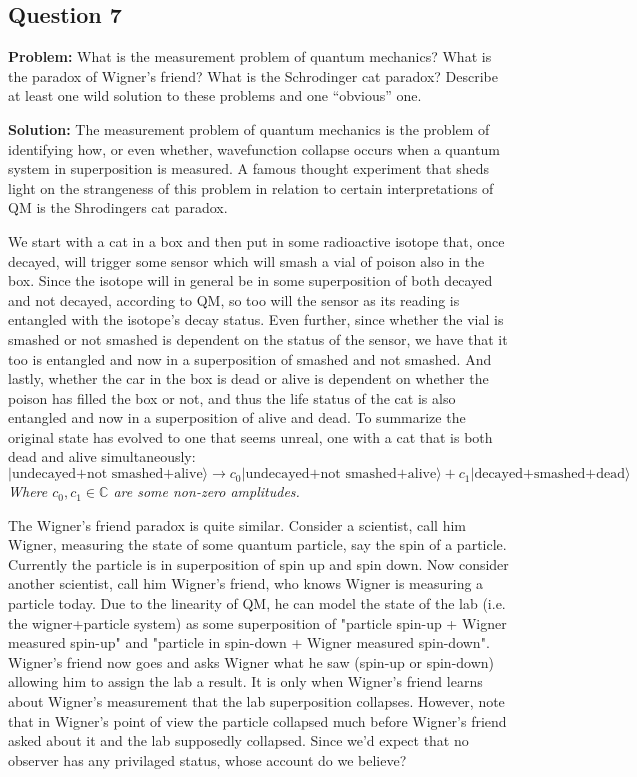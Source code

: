 \documentclass{article}
\begin{document}
\subsection*{Question 7}
\noindent\textbf{Problem:} What is the measurement problem of quantum mechanics? What is the paradox of Wigner's friend? What is the Schrodinger cat paradox? Describe at least one wild solution to these problems and one ``obvious'' one.
\bigskip

\noindent\textbf{Solution:} The measurement problem of quantum mechanics is the problem of identifying how, or even whether, wavefunction collapse occurs when a quantum system in superposition is measured. A famous thought experiment that sheds light on the strangeness of this problem in relation to certain interpretations of QM is the Shrodingers cat paradox.

We start with a cat in a box and then put in some radioactive isotope that, once decayed, will trigger some sensor which will smash a vial of poison also in the box. Since the isotope will in general be in some superposition of both decayed and not decayed, according to QM, so too will the sensor as its reading is entangled with the isotope's decay status. Even further, since whether the vial is smashed or not smashed is dependent on the status of the sensor, we have that it too is entangled and now in a superposition of smashed and not smashed. And lastly, whether the car in the box is dead or alive is dependent on whether the poison has filled the box or not, and thus the life status of the cat is also entangled and now in a superposition of alive and dead. To summarize the original state has evolved to one that seems unreal, one with a cat that is both dead and alive simultaneously:
$$|\text{undecayed+not smashed+alive}\rangle\rightarrow c_0|\text{undecayed+not smashed+alive}\rangle+c_1|\text{decayed+smashed+dead}\rangle$$
\textit{Where $c_0,c_1\in\mathbb C$ are some non-zero amplitudes.}
\medskip

The Wigner's friend paradox is quite similar. Consider a scientist, call him Wigner, measuring the state of some quantum particle, say the spin of a particle. Currently the particle is in superposition of spin up and spin down. Now consider another scientist, call him Wigner's friend, who knows Wigner is measuring a particle today. Due to the linearity of QM, he can model the state of the lab (i.e. the wigner+particle system) as some superposition of "particle spin-up + Wigner measured spin-up" and "particle in spin-down + Wigner measured spin-down". Wigner's friend now goes and asks Wigner what he saw (spin-up or spin-down) allowing him to assign the lab a result. It is only when Wigner's friend learns about Wigner's measurement that the lab superposition collapses. However, note that in Wigner's point of view the particle collapsed much before Wigner's friend asked about it and the lab supposedly collapsed. Since we'd expect that no observer has any privilaged status, whose account do we believe?
\bigskip
\end{document}
